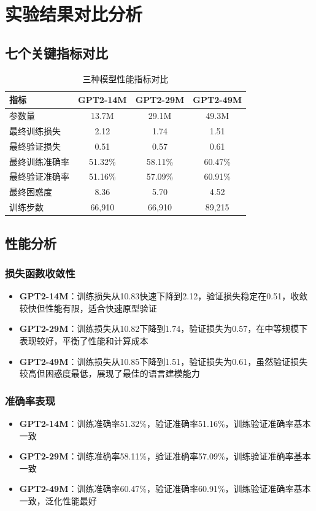 \documentclass{article}
\begin{document}
\section{实验结果对比分析}

\subsection{七个关键指标对比}

\begin{table}[h]
\centering
\caption{三种模型性能指标对比}
\begin{tabular}{lccc}
\toprule
\textbf{指标} & \textbf{GPT2-14M} & \textbf{GPT2-29M} & \textbf{GPT2-49M} \\
\midrule
参数量 & 13.7M & 29.1M & 49.3M \\
最终训练损失 & 2.12 & 1.74 & 1.51 \\
最终验证损失 & 0.51 & 0.57 & 0.61 \\
最终训练准确率 & 51.32\% & 58.11\% & 60.47\% \\
最终验证准确率 & 51.16\% & 57.09\% & 60.91\% \\
最终困惑度 & 8.36 & 5.70 & 4.52 \\
训练步数 & 66,910 & 66,910 & 89,215 \\
\bottomrule
\end{tabular}
\end{table}

\subsection{性能分析}

\subsubsection{损失函数收敛性}
\begin{itemize}
    \item \textbf{GPT2-14M}：训练损失从10.83快速下降到2.12，验证损失稳定在0.51，收敛较快但性能有限，适合快速原型验证
    \item \textbf{GPT2-29M}：训练损失从10.82下降到1.74，验证损失为0.57，在中等规模下表现较好，平衡了性能和计算成本
    \item \textbf{GPT2-49M}：训练损失从10.85下降到1.51，验证损失为0.61，虽然验证损失较高但困惑度最低，展现了最佳的语言建模能力
\end{itemize}

\subsubsection{准确率表现}
\begin{itemize}
    \item \textbf{GPT2-14M}：训练准确率51.32\%，验证准确率51.16\%，训练验证准确率基本一致
    \item \textbf{GPT2-29M}：训练准确率58.11\%，验证准确率57.09\%，训练验证准确率基本一致
    \item \textbf{GPT2-49M}：训练准确率60.47\%，验证准确率60.91\%，训练验证准确率基本一致，泛化性能最好
\end{itemize}
\end{document}
